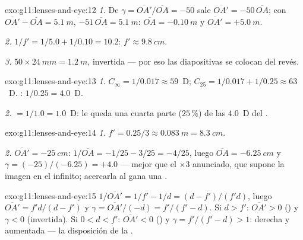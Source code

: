 \begin{solution}{exo:g11:lenses-and-eye:12}
\emph{1.} De $\gamma = \overline{OA'}/\overline{OA} = -50$ sale
$\overline{OA'} = -50\,\overline{OA}$; con
$\overline{OA'} - \overline{OA} = \qty{5.1}{m}$,
$-51\,\overline{OA} = \qty{5.1}{m}$: $\overline{OA} = \qty{-0.10}{m}$ y
$\overline{OA'} = +\qty{5.0}{m}$.

\emph{2.} $1/f' = 1/5.0 + 1/0.10 = 10.2$: $f' \approx \qty{9.8}{cm}$.

\emph{3.} $50 \times \qty{24}{mm} = \qty{1.2}{m}$, invertida --- por eso
las diapositivas se colocan del revés.
\end{solution}

\begin{solution}{exo:g11:lenses-and-eye:13}
\emph{1.} $C_\infty = 1/0.017 \approx 59$~D;
$C_{25} = 1/0.017 + 1/0.25 \approx 63$~D. :
$1/0.25 = 4.0$~D.

\emph{2.}  $= 1/1.0 = 1.0$~D: le queda una cuarta parte
($25\,\%$) de las $4.0$~D del .
\end{solution}

\begin{solution}{exo:g11:lenses-and-eye:14}
\emph{1.} $f' = 0.25/3 \approx \qty{0.083}{m} = \qty{8.3}{cm}$.

\emph{2.} $\overline{OA'} = \qty{-25}{cm}$:
$1/\overline{OA} = -1/25 - 3/25 = -4/25$, luego
$\overline{OA} = \qty{-6.25}{cm}$ y
$\gamma = (-25)/(-6.25) = +4.0$ --- mejor que el $\times 3$ anunciado,
que supone la imagen en el infinito; acercarla al  gana una
.
\end{solution}

\begin{solution}{exo:g11:lenses-and-eye:15}
$1/\overline{OA'} = 1/f' - 1/d = (d - f')/(f'd)$, luego
$\overline{OA'} = f'd/(d - f')$ y
$\gamma = \overline{OA'}/(-d) = f'/(f' - d)$. Si $d > f'$:
$\overline{OA'} > 0$ () y $\gamma < 0$ (invertida). Si
$0 < d < f'$: $\overline{OA'} < 0$ () y
$\gamma = f'/(f' - d) > 1$: derecha y aumentada --- la disposición de la
.
\end{solution}

